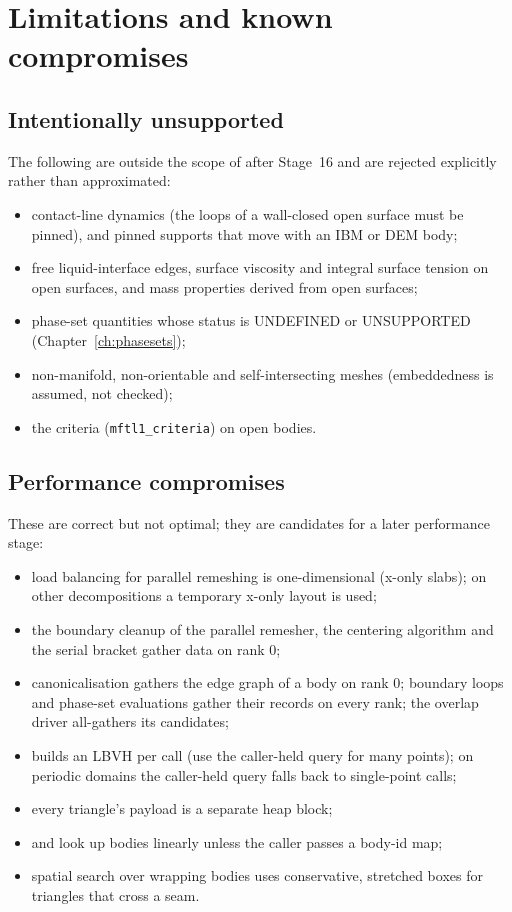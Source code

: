 \chapter{Limitations and known compromises}
\label{ch:limitations}

\section{Intentionally unsupported}

The following are outside the scope of \mftl{} after Stage~16 and are rejected explicitly
rather than approximated:
\begin{itemize}
  \item contact-line dynamics (the loops of a wall-closed open surface must be pinned), and
    pinned supports that move with an IBM or DEM body;
  \item free liquid-interface edges, surface viscosity and integral surface tension on open
    surfaces, and mass properties derived from open surfaces;
  \item phase-set quantities whose status is UNDEFINED or UNSUPPORTED (Chapter~\ref{ch:phasesets});
  \item non-manifold, non-orientable and self-intersecting meshes (embeddedness is assumed, not
    checked);
  \item the \mftlone{} criteria (\texttt{mftl1\_criteria}) on open bodies.
\end{itemize}

\section{Performance compromises}

These are correct but not optimal; they are candidates for a later performance stage:
\begin{itemize}
  \item load balancing for parallel remeshing is one-dimensional (x-only slabs); on other
    decompositions a temporary x-only layout is used;
  \item the boundary cleanup of the parallel remesher, the centering algorithm and the serial
    bracket gather data on rank 0;
  \item canonicalisation gathers the edge graph of a body on rank 0; boundary loops and
    phase-set evaluations gather their records on every rank; the overlap driver all-gathers its
    candidates;
  \item {} builds an LBVH per call (use the caller-held query for many
    points); on periodic domains the caller-held query falls back to single-point calls;
  \item every triangle's payload is a separate heap block;
  \item {} and  look up bodies linearly
    unless the caller passes a body-id map;
  \item spatial search over wrapping bodies uses conservative, stretched boxes for triangles that
    cross a seam.
\end{itemize}

